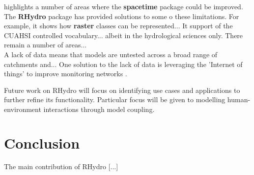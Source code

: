 \documentclass{icldt}\usepackage[]{graphicx}\usepackage[]{color}
\begin{document}
\citet{pebesma2012} highlights a number of areas where the \textbf{spacetime} package could be improved. The \textbf{RHydro} package has provided solutions to some o these limitations. For example, it shows how \textbf{raster} classes can be represented... It support of the CUAHSI controlled vocabulary... albeit in the hydrological sciences only. There remain a number of areas... \\

A lack of data means that models are untested across a broad range of catchments and... One solution to the lack of data is leveraging the 'Internet of things' to improve monitoring networks \citep{buytaert2014}.

Future work on RHydro will focus on identifying use cases and applications to further refine its functionality. Particular focus will be given to modelling human-environment interactions through model coupling. \\




\section{Conclusion}

The main contribution of RHydro [...] \\

\end{document}
